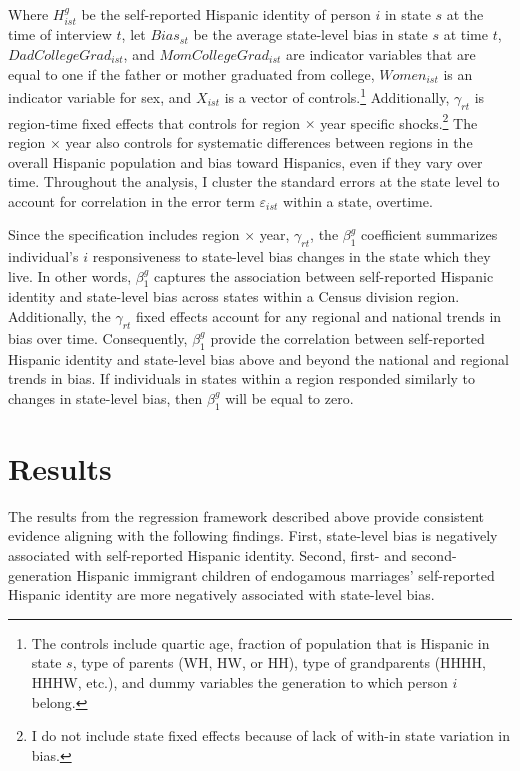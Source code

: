 \documentclass[12pt,english]{article}
\begin{document}
Where $H_{ist}^g$ be the self-reported Hispanic identity of person $i$ in state $s$ at the time of interview $t$, let $Bias_{st}$ be the average state-level bias in state $s$ at time $t$, $DadCollegeGrad_{ist}$, and $MomCollegeGrad_{ist}$ are indicator variables that are equal to one if the father or mother graduated from college, $Women_{ist}$ is an indicator variable for sex, and $X_{ist}$ is a vector of controls.\footnote{The controls include quartic age, fraction of population that is Hispanic in state $s$, type of parents (WH, HW, or HH), type of grandparents (HHHH, HHHW, etc.), and dummy variables the generation to which person $i$ belong.} Additionally, $\gamma_{rt}$ is region-time fixed effects that controls for region $\times$ year specific shocks.\footnote{I do not include state fixed effects because of lack of with-in state variation in bias.} The region $\times$ year also controls for systematic differences between regions in the overall Hispanic population and bias toward Hispanics, even if they vary over time. Throughout the analysis, I cluster the standard errors at the state level to account for correlation in the error term $\varepsilon_{ist}$ within a state, overtime.

Since the specification includes region $\times$ year, $\gamma_{rt}$, the $\beta_1^g$ coefficient summarizes individual's $i$ responsiveness to state-level bias changes in the state which they live. In other words, $\beta_1^g$ captures the association between self-reported Hispanic identity and state-level bias across states within a Census division region. Additionally, the $\gamma_{rt}$ fixed effects account for any regional and national trends in bias over time. Consequently, $\beta_1^g$ provide the correlation between self-reported Hispanic identity and state-level bias above and beyond the national and regional trends in bias. If individuals in states within a region responded similarly to changes in state-level bias, then $\beta_1^g$ will be equal to zero. 

\section{Results}\label{sec:results}
The results from the regression framework described above provide consistent evidence aligning with the following findings. First, state-level bias is negatively associated with self-reported Hispanic identity. Second, first- and second-generation Hispanic immigrant children of endogamous marriages' self-reported Hispanic identity are more negatively associated with state-level bias. 
\end{document}

